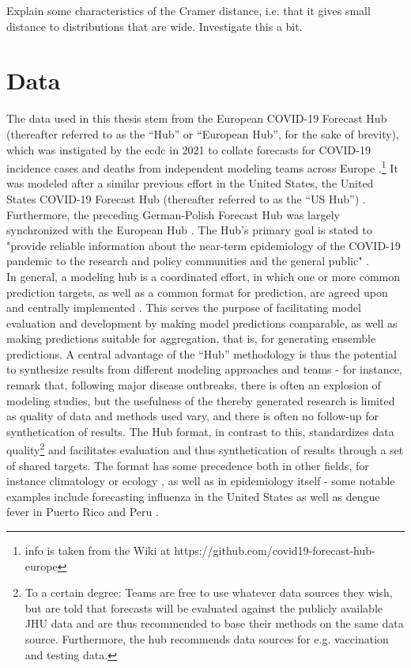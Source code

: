 Explain some characteristics of the Cramer distance, i.e. that it gives small distance to distributions that are wide. Investigate this a bit.
\section{Data}
The data used in this thesis stem from the European COVID-19 Forecast Hub (thereafter referred to as the ``Hub'' or ``European Hub'', for the sake of brevity), which was instigated by the \ac{ecdc} in 2021 to collate forecasts for COVID-19 incidence cases and deaths from independent modeling teams across Europe \citep{european_covid-19_forecast_hub_european_2021}.\footnote{info is taken from the Wiki at https://github.com/covid19-forecast-hub-europe} It was modeled after a similar previous effort in the United States, the United States COVID-19 Forecast Hub (thereafter referred to as the ``US Hub'') \citep{cramer_united_2021}. Furthermore, the preceding German-Polish Forecast Hub was largely synchronized with the European Hub \citep{bracher_german_2020}. The Hub's primary goal is stated to "provide reliable information about the near-term epidemiology of the COVID-19 pandemic to the research and policy communities and the general public" \citep{sherratt_predictive_2022}.\\ 
In general, a modeling hub is a coordinated effort, in which one or more common prediction targets, as well as a common format for prediction, are agreed upon and centrally implemented \citep{reich_collaborative_2022}. This serves the purpose of facilitating model evaluation and development by making model predictions comparable, as well as making predictions suitable for aggregation, that is, for generating ensemble predictions. A central advantage of the ``Hub'' methodology is thus the potential to synthesize results from different modeling approaches and teams - for instance, \cite{metcalf_opportunities_2017} remark that, following major disease outbreaks, there is often an explosion of modeling studies, but the usefulness of the thereby generated research is limited as quality of data and methods used vary, and there is often no follow-up for synthetication of results. %
The Hub format, in contrast to this, standardizes data quality\footnote{To a certain degree: Teams are free to use whatever data sources they wish, but are told that forecasts will be evaluated against the publicly available JHU data and are thus recommended to base their methods on the same data source. Furthermore, the hub recommends data sources for e.g. vaccination and testing data.} and facilitates evaluation and thus synthetication of results through a set of shared targets. The format has some precedence both in other fields, for instance climatology or ecology \citep{warszawski_inter-sectoral_2014}, as well as in epidemiology itself - some notable examples include forecasting influenza in the United States \citep{reich_collaborative_2019} as well as dengue fever in Puerto Rico and Peru \citep{johansson_open_2019}. \\
